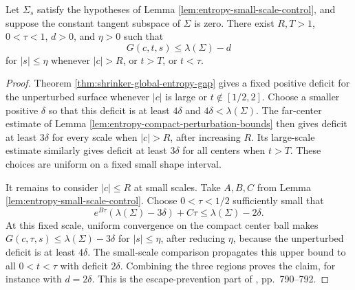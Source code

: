 \begin{lemma}\label{lem:entropy-parameter-exclusion}
Let $\Sigma_s$ satisfy the hypotheses of Lemma \ref{lem:entropy-small-scale-control}, and suppose the constant tangent subspace of $\Sigma$ is zero. There exist $R,T>1$, $0<\tau<1$, $d>0$, and $\eta>0$ such that
\[
 G(c,t,s)\leq\lambda(\Sigma)-d
\]
for $|s|\leq\eta$ whenever $|c|>R$, or $t>T$, or $t<\tau$.
\end{lemma}
\begin{proof}
Theorem \ref{thm:shrinker-global-entropy-gap} gives a fixed positive deficit for the unperturbed surface whenever $|c|$ is large or $t\notin[1/2,2]$. Choose a smaller positive $\delta$ so that this deficit is at least $4\delta$ and $4\delta<\lambda(\Sigma)$. The far-center estimate of Lemma \ref{lem:entropy-compact-perturbation-bounds} then gives deficit at least $3\delta$ for every scale when $|c|>R$, after increasing $R$. Its large-scale estimate similarly gives deficit at least $3\delta$ for all centers when $t>T$. These choices are uniform on a fixed small shape interval.

It remains to consider $|c|\leq R$ at small scales. Take $A,B,C$ from Lemma \ref{lem:entropy-small-scale-control}. Choose $0<\tau<1/2$ sufficiently small that
\[
 e^{B\tau}(\lambda(\Sigma)-3\delta)+C\tau
 \leq\lambda(\Sigma)-2\delta.
\]
At this fixed scale, uniform convergence on the compact center ball makes $G(c,\tau,s)\leq\lambda(\Sigma)-3\delta$ for $|s|\leq\eta$, after reducing $\eta$, because the unperturbed deficit is at least $4\delta$. The small-scale comparison propagates this upper bound to all $0<t<\tau$ with deficit $2\delta$. Combining the three regions proves the claim, for instance with $d=2\delta$. This is the escape-prevention part of \cite{CM12}, pp.~790--792.
\end{proof}


